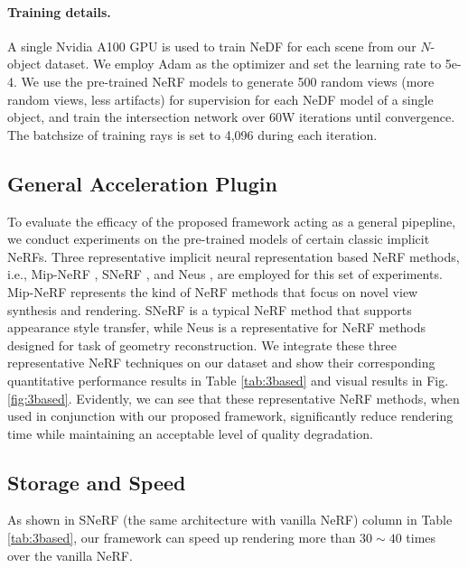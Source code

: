 \documentclass[letterpaper]{article}
\begin{document}
\paragraph{Training details.}A single Nvidia A100 GPU is used to train NeDF for each scene from our $N$-object dataset. We employ Adam as the optimizer and set the learning rate to 5e-4. We use the pre-trained NeRF models to generate 500 random views (more random views, less artifacts) for supervision for each NeDF model of a single object, and train the intersection network over 60W iterations until convergence. The batchsize of training rays is set to 4,096 during each iteration.

\subsection{General Acceleration Plugin}
To evaluate the efficacy of the proposed framework acting as a general pipepline, we conduct experiments on the pre-trained models of certain classic implicit NeRFs. Three representative
implicit neural representation based NeRF methods, i.e., Mip-NeRF \cite{barron2021mip},
SNeRF \cite{snerf2022}, and Neus \cite{wang2021neus}, are employed for this set of experiments.
Mip-NeRF represents the kind of NeRF methods that focus on novel view synthesis and rendering. SNeRF is a typical NeRF method that supports appearance style transfer, while Neus is a representative for NeRF methods designed for task of geometry reconstruction.
We integrate these three representative NeRF techniques on our dataset and show their corresponding quantitative performance results in Table \ref{tab:3based} and visual results in Fig. \ref{fig:3based}. Evidently, we can see that these representative NeRF methods, when used in conjunction with our proposed framework, significantly reduce rendering time while maintaining an acceptable level of quality degradation.

\subsection{Storage and Speed}
As shown in SNeRF (the same architecture with vanilla NeRF) column in Table \ref{tab:3based}, our framework can speed up rendering more than $30 \sim 40$ times over the vanilla NeRF.
\end{document}
